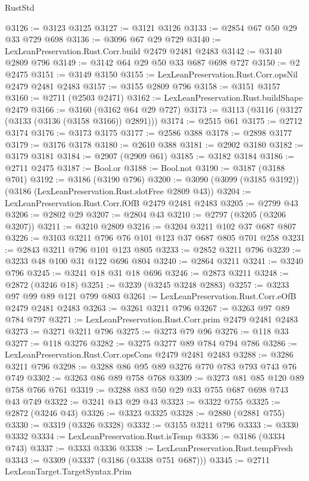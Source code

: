 \begin{lexlean}{RustStd}
\begin{coremodule}
@3126 := @3123 @3125
@3127 := @3121 @3126
@3133 := @2854 @67 @50 @29 @33 @729 @698
@3136 := @3096 @67 @29 @729
@3140 := LexLeanPreservation.Rust.Corr.build @2479 @2481 @2483
@3142 := @3140 @2809 @796
@3149 := @3142 @64 @29 @50 @33 @687 @698 @727
@3150 := @2 @2475
@3151 := @3149 @3150
@3155 := LexLeanPreservation.Rust.Corr.opsNil @2479 @2481 @2483
@3157 := @3155 @2809 @796
@3158 := @3151 @3157
@3160 := @2711 (@2503 @2471)
@3162 := LexLeanPreservation.Rust.buildShape @2479
@3166 := @3160 (@3162 @64 @29 @727)
@3173 := @3113 (@3116 (@3127 (@3133 (@3136 (@3158 @3166)) @2891)))
@3174 := @2515 @61
@3175 := @2712 @3174
@3176 := @3173 @3175
@3177 := @2586 @388
@3178 := @2898 @3177
@3179 := @3176 @3178
@3180 := @2610 @388
@3181 := @2902 @3180
@3182 := @3179 @3181
@3184 := @2907 (@2909 @61)
@3185 := @3182 @3184
@3186 := @2711 @2475
@3187 := Bool.or
@3188 := Bool.not
@3190 := @3187 (@3188 @701)
@3192 := @3186 (@3190 @796)
@3200 := @3090 (@3099 (@3185 @3192)) (@3186 (LexLeanPreservation.Rust.slotFree @2809 @43))
@3204 := LexLeanPreservation.Rust.Corr.fOfB @2479 @2481 @2483
@3205 := @2799 @43
@3206 := @2802 @29
@3207 := @2804 @43
@3210 := @2797 (@3205 (@3206 @3207))
@3211 := @3210 @2809
@3216 := @3204 @3211 @102 @37 @687 @807
@3226 := @3103 @3211 @796 @76 @101 @123 @37 @687 @805 @701 @258
@3231 := @2843 @3211 @796 @101 @123 @805
@3233 := @2852 @3211 @796
@3239 := @3233 @48 @100 @31 @122 @696 @804
@3240 := @2864 @3211
@3241 := @3240 @796
@3245 := @3241 @18 @31 @18 @696
@3246 := @2873 @3211
@3248 := @2872 (@3246 @18)
@3251 := @3239 (@3245 @3248 @2883)
@3257 := @3233 @97 @99 @89 @121 @799 @803
@3261 := LexLeanPreservation.Rust.Corr.eOfB @2479 @2481 @2483
@3263 := @3261 @3211 @796
@3267 := @3263 @97 @89 @784 @797
@3271 := LexLeanPreservation.Rust.Corr.prim @2479 @2481 @2483
@3273 := @3271 @3211 @796
@3275 := @3273 @79 @96
@3276 := @118 @33
@3277 := @118 @3276
@3282 := @3275 @3277 @89 @784 @794 @786
@3286 := LexLeanPreservation.Rust.Corr.opsCons @2479 @2481 @2483
@3288 := @3286 @3211 @796
@3298 := @3288 @86 @95 @89 @3276 @770 @783 @793 @743 @76 @749
@3302 := @3263 @86 @89 @758 @768
@3309 := @3273 @81 @85 @120 @89 @758 @766 @761
@3319 := @3288 @83 @50 @29 @33 @755 @687 @698 @743 @43 @749
@3322 := @3241 @43 @29 @43
@3323 := @3322 @755
@3325 := @2872 (@3246 @43)
@3326 := @3323 @3325
@3328 := @2880 (@2881 @755)
@3330 := @3319 (@3326 @3328)
@3332 := @3155 @3211 @796
@3333 := @3330 @3332
@3334 := LexLeanPreservation.Rust.isTemp
@3336 := @3186 (@3334 @743)
@3337 := @3333 @3336
@3338 := LexLeanPreservation.Rust.tempFresh
@3343 := @3309 (@3337 (@3186 (@3338 @751 @687)))
@3345 := @2711 LexLeanTarget.TargetSyntax.Prim

\end{coremodule}
\end{lexlean}

